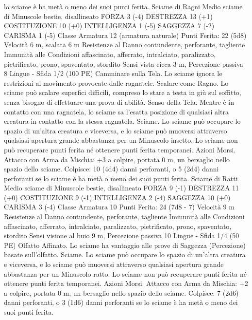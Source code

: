 \begin{multicols}{2}
lo sciame è ha metà o meno dei suoi punti ferita.
Sciame di Ragni
Medio sciame di Minuscole bestie, disallineato
FORZA 3 (-4)
DESTREZZA 13 (+1)
COSTITUZIONE 10 (+0)
INTELLIGENZA 1 (-5)
SAGGEZZA 7 (-2)
CARISMA 1 (-5)
Classe Armatura 12 (armatura naturale)
\hspace*{0pt}\hfill{Punti Ferita}: 22 (5d8)
Velocità 6 m, scalata 6 m
Resistenze al Danno contundente, perforante, tagliente
Immunità alle Condizioni affascinato, afferrato, intralciato,
paralizzato, pietrificato, prono, spaventato, stordito
Sensi vista cieca 3 m, Percezione passiva 8
Lingue -
Sfida 1/2 (100 PE)
Camminare sulla Tela. Lo sciame ignora le restrizioni al
movimento provocate dalle ragnatele.
Scalare come Ragno. Lo sciame può scalare superfici difficili,
compreso lo stare a testa in giù sul soffitto, senza bisogno di
effettuare una prova di abilità.
Senso della Tela. Mentre è in contatto con una ragnatela, lo
sciame sa l’esatta posizione di qualsiasi altra creatura in contatto
con la stessa ragnatela.
Sciame. Lo sciame può occupare lo spazio di un’altra creatura e
viceversa, e lo sciame può muoversi attraverso qualsiasi apertura
grande abbastanza per un Minuscolo insetto. Lo sciame non può
recuperare punti ferita né ottenere punti ferita temporanei.
Azioni
Morsi. Attacco con Arma da Mischia: +3 a colpire, portata 0 m,
un bersaglio nello spazio dello sciame.
Colpisce: 10 (4d4) danni perforanti, o 5 (2d4) danni perforanti se
lo sciame è ha metà o meno dei suoi punti ferita.
Sciame di Ratti
Medio sciame di Minuscole bestie, disallineato
FORZA 9 (-1)
DESTREZZA 11 (+0)
COSTITUZIONE 9 (-1)
INTELLIGENZA 2 (-4)
SAGGEZZA 10 (+0)
CARISMA 3 (-4)
Classe Armatura 10
\hspace*{0pt}\hfill{Punti Ferita}: 24 (7d8 - 7)
Velocità 9 m
Resistenze al Danno contundente, perforante, tagliente
Immunità alle Condizioni affascinato, afferrato, intralciato,
paralizzato, pietrificato, prono, spaventato, stordito
Sensi visione al buio 9 m, Percezione passiva 10
Lingue -
Sfida 1/4 (50 PE)
Olfatto Affinato. Lo sciame ha vantaggio alle prove di Saggezza
(Percezione) basate sull’olfatto.
Sciame. Lo sciame può occupare lo spazio di un’altra creatura e
viceversa, e lo sciame può muoversi attraverso qualsiasi apertura
grande abbastanza per un Minuscolo ratto. Lo sciame non può
recuperare punti ferita né ottenere punti ferita temporanei.
Azioni
Morsi. Attacco con Arma da Mischia: +2 a colpire, portata 0 m,
un bersaglio nello spazio dello sciame.
Colpisce: 7 (2d6) danni perforanti, o 3 (1d6) danni perforanti se
lo sciame è ha metà o meno dei suoi punti ferita.

\end{multicols}
